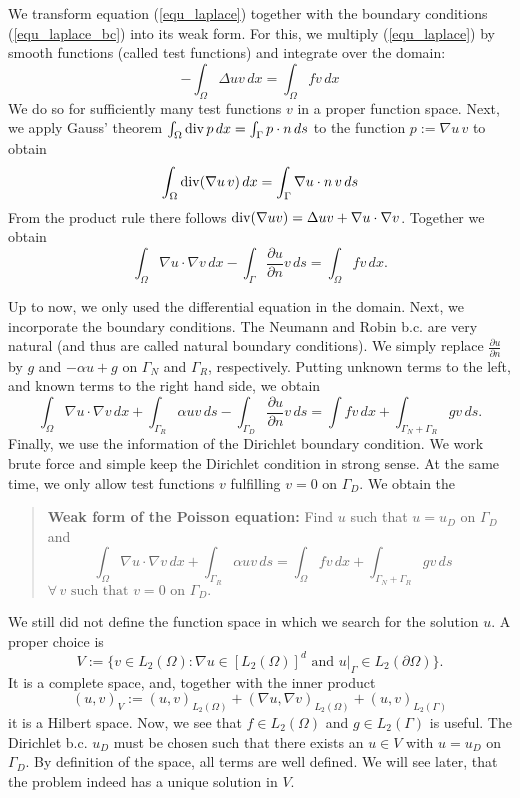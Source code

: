 We transform equation (\ref{equ_laplace}) together with the boundary
conditions (\ref{equ_laplace_bc}) into its weak
form. For this, we multiply (\ref{equ_laplace}) by smooth functions 
(called test functions) and integrate over the domain:
\begin{equation}
\label{equ_multiplied}
- \int_\Omega \Delta u v \, dx  = \int_\Omega f v \, dx 
\end{equation}
We do so for sufficiently many test functions $v$ in a proper function space.
Next, we apply Gauss' theorem 
$
\int_\Omega \operatorname{div} p \, dx = \int_\Gamma p \cdot n \, ds
$ 
to the function $p := \nabla u \, v$ to obtain
$$
\int_\Omega \operatorname{div} (\nabla u \, v) \, dx = \int_\Gamma \nabla u \cdot n \, v \, ds
$$
From the product rule there follows $\operatorname{div} (\nabla u v) = \Delta u v + \nabla u \cdot \nabla v$. Together we obtain
$$
\int_\Omega \nabla u \cdot \nabla v \, dx - \int_\Gamma \frac{\partial u}{\partial n} v \, ds = \int_\Omega f v \, dx.
$$


Up to now, we only used the differential equation in the domain. Next, we
incorporate the boundary conditions. The Neumann and Robin b.c. are very
natural (and thus are called natural boundary conditions). We simply replace
$\frac{\partial u}{\partial n}$ by $g$ and $-\alpha u + g$ on $\Gamma_N$ and
$\Gamma_R$, respectively. Putting unknown terms to the left, and known terms
to the right hand side, we obtain
$$
\int_\Omega \nabla u \cdot \nabla v \, dx + \int_{\Gamma_R} \alpha u v \, ds 
-\int_{\Gamma_D} \frac{\partial u}{\partial n} v \, ds = 
\int f v \, dx + \int_{\Gamma_N+\Gamma_R} g v \, ds.
$$
Finally, we use the information of the Dirichlet boundary condition. We
work brute force and simple keep the Dirichlet condition in strong sense.
At the same time, we only allow test functions $v$ fulfilling $v = 0$
on $\Gamma_D$. We obtain the 
\begin{quote}
{\bf Weak form of the Poisson equation:} \newline
Find $u$ such that $u = u_D$ on $\Gamma_D$ and
\begin{equation}
\label{equ_weak_form}
\int_\Omega \nabla u \cdot \nabla v \, dx + \int_{\Gamma_R} \alpha u v \, ds = 
\int_\Omega f v \, dx + \int_{\Gamma_N+\Gamma_R} g v \, ds \quad
\end{equation}
\hfill $\forall \, v \mbox{ such that } v = 0 \mbox{ on } \Gamma_D.$
\end{quote}
%
We still did not define the function space in which we search for the
solution $u$. A proper choice is $$ V := \{ v \in L_2(\Omega) : \nabla
u \in [L_2(\Omega)]^d \mbox{ and } u|_\Gamma \in L_2(\partial \Omega)
\}.  $$ It is a complete space, and, together with the inner product
$$ (u,v)_V := (u,v)_{L_2(\Omega)} + (\nabla u, \nabla v)_{L_2(\Omega)}
+ (u, v)_{L_2(\Gamma)} $$ it is a Hilbert space.  Now, we see that $f
\in L_2(\Omega)$ and $g \in L_2(\Gamma)$ is useful. The Dirichlet
b.c. $u_D$ must be chosen such that there exists an $u \in V$ with $u
= u_D$ on $\Gamma_D$.  By definition of the space, all terms are well
defined. We will see later, that the problem indeed has a unique
solution in $V$. 



